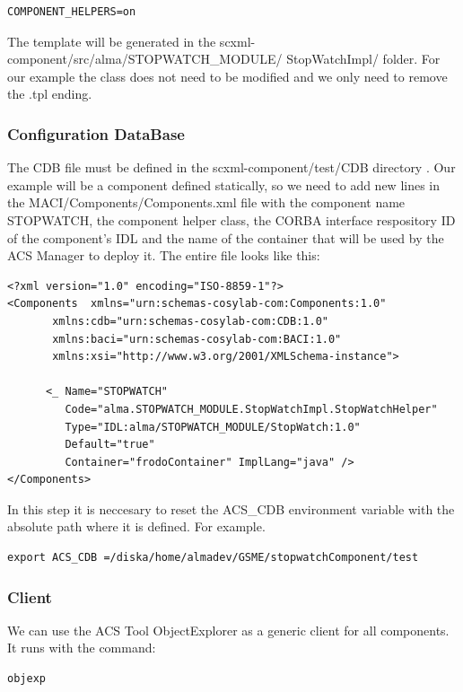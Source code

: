 \documentclass[]{article}
\begin{document}
\begin{lstlisting}
COMPONENT_HELPERS=on
\end{lstlisting}

The template will be generated in the \textsf{scxml-component/src/alma/STOPWATCH\_MODULE/ StopWatchImpl/} folder. For our example the class does not need to be modified and we only need to remove the .tpl ending. 

\subsubsection{Configuration DataBase}

The CDB file must be defined in the \textsf{scxml-component/test/CDB directory} . Our example will be a component defined statically, so we need to add new lines in the \textsf{MACI/Components/Components.xml} file with the component name STOPWATCH, the component helper class, the CORBA interface respository ID of the component's IDL and the name of the container that will be used by the ACS Manager to deploy it. The entire file looks like this: 

\begin{lstlisting}
<?xml version="1.0" encoding="ISO-8859-1"?>
<Components  xmlns="urn:schemas-cosylab-com:Components:1.0"
       xmlns:cdb="urn:schemas-cosylab-com:CDB:1.0" 
       xmlns:baci="urn:schemas-cosylab-com:BACI:1.0" 
       xmlns:xsi="http://www.w3.org/2001/XMLSchema-instance">

      <_ Name="STOPWATCH"
         Code="alma.STOPWATCH_MODULE.StopWatchImpl.StopWatchHelper"
         Type="IDL:alma/STOPWATCH_MODULE/StopWatch:1.0"
         Default="true"
         Container="frodoContainer" ImplLang="java" />
</Components>
\end{lstlisting}

In this step it is neccesary to reset the \textsf{ACS\_CDB} environment variable with the absolute path where it is defined. For example. 
\begin{lstlisting}
export ACS_CDB =/diska/home/almadev/GSME/stopwatchComponent/test 
\end{lstlisting}

\subsubsection{Client}

We can use the ACS Tool \textsf{ObjectExplorer} as a generic client for all components. It runs with the command: 

\begin{lstlisting}
objexp
\end{lstlisting}

\clearpage

		
\end{document}
